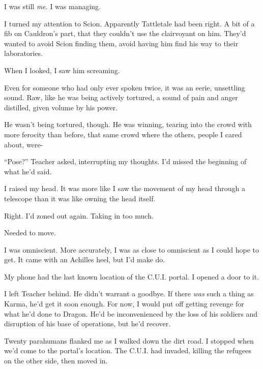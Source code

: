 I was still \emph{me}.  I was managing.



I turned my attention to Scion.  Apparently Tattletale had been right.  A bit of a fib on Cauldron's part, that they couldn't use the clairvoyant on him.  They'd wanted to avoid Scion finding them, avoid having him find his way to their laboratories.



When I looked, I saw him screaming.



Even for someone who had only ever spoken twice, it was an eerie, unsettling sound.  Raw, like he was being actively tortured, a sound of pain and anger distilled, given volume by his power.



He wasn't being tortured, though.  He was winning, tearing into the crowd with more ferocity than before, that same crowd where the others, people I cared about, were-



``Pose?'' Teacher asked, interrupting my thoughts.  I'd missed the beginning of what he'd said.



I raised my head.  It was more like I saw the movement of my head through a telescope than it was like owning the head itself.



Right.  I'd zoned out again.  Taking in too much.



Needed to move.



I was omniscient.  More accurately, I was as close to omniscient as I could hope to get.  It came with an Achilles heel, but I'd make do.



My phone had the last known location of the C.U.I. portal.  I opened a door to it.



I left Teacher behind.  He didn't warrant a goodbye.  If there \emph{was} such a thing as Karma, he'd get it soon enough.  For now, I would put off getting revenge for what he'd done to Dragon.  He'd be inconvenienced by the loss of his soldiers and disruption of his base of operations, but he'd recover.



Twenty parahumans flanked me as I walked down the dirt road.  I stopped when we'd come to the portal's location.  The C.U.I. had invaded, killing the refugees on the other side, then moved in.



